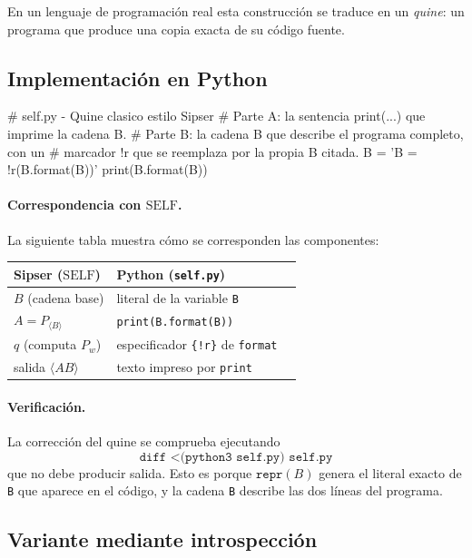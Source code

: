 \documentclass[11pt,a4paper]{article}
\theoremstyle{plain}
\theoremstyle{definition}
\theoremstyle{remark}
\newcommand{\enc}[1]{\langle #1\rangle}
\newcommand{\SELF}{\mathrm{SELF}}
\newcommand{\Pw}[1]{P_{#1}}
\begin{document}
En un lenguaje de programaci\'on real esta construcci\'on se traduce en un
\emph{quine}: un programa que produce una copia exacta de su c\'odigo fuente.

\subsection*{Implementaci\'on en Python}

\begin{pycode}
# self.py - Quine clasico estilo Sipser
# Parte A: la sentencia print(...) que imprime la cadena B.
# Parte B: la cadena B que describe el programa completo, con un
# marcador {!r} que se reemplaza por la propia B citada.
B = 'B = {!r}\nprint(B.format(B))\n'
print(B.format(B))
\end{pycode}

\paragraph{Correspondencia con $\SELF$.}
La siguiente tabla muestra c\'omo se corresponden las componentes:

\begin{center}
\begin{tabular}{lll}
\toprule
Sipser ($\SELF$)                  & Python (\texttt{self.py})              \\
\midrule
$B$ (cadena base)                 & literal de la variable \texttt{B}      \\
$A = \Pw{\enc{B}}$                & \texttt{print(B.format(B))}            \\
$q$ (computa $\Pw{w}$)            & especificador \texttt{\{!r\}} de \texttt{format} \\
salida $\enc{AB}$                 & texto impreso por \texttt{print}       \\
\bottomrule
\end{tabular}
\end{center}

\paragraph{Verificaci\'on.}
La correcci\'on del quine se comprueba ejecutando
\[
  \texttt{diff <(python3 self.py) self.py}
\]
que no debe producir salida. Esto es porque $\texttt{repr}(B)$ genera el
literal exacto de \texttt{B} que aparece en el c\'odigo, y la cadena
\texttt{B} describe las dos l\'ineas del programa.

\subsection*{Variante mediante introspecci\'on}
\end{document}
